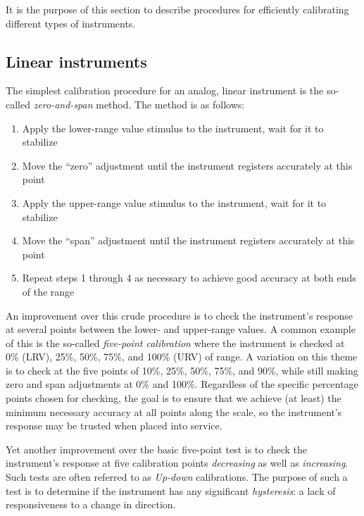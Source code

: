 
It is the purpose of this section to describe procedures for efficiently calibrating different types of instruments.

\filbreak
\subsection{Linear instruments}

The simplest calibration procedure for an analog, linear instrument is the so-called \textit{zero-and-span} method.  The method is as follows:

\begin{enumerate}
\item Apply the lower-range value stimulus to the instrument, wait for it to stabilize
\item Move the ``zero'' adjustment until the instrument registers accurately at this point
\item Apply the upper-range value stimulus to the instrument, wait for it to stabilize
\item Move the ``span'' adjustment until the instrument registers accurately at this point
\item Repeat steps 1 through 4 as necessary to achieve good accuracy at both ends of the range
\end{enumerate}

An improvement over this crude procedure is to check the instrument's response at several points between the lower- and upper-range values.  A common example of this is the so-called \textit{five-point calibration} where the instrument is checked at 0\% (LRV), 25\%, 50\%, 75\%, and 100\% (URV) of range.  A variation on this theme is to check at the five points of 10\%, 25\%, 50\%, 75\%, and 90\%, while still making zero and span adjustments at 0\% and 100\%.  Regardless of the specific percentage points chosen for checking, the goal is to ensure that we achieve (at least) the minimum necessary accuracy at all points along the scale, so the instrument's response may be trusted when placed into service.  

Yet another improvement over the basic five-point test is to check the instrument's response at five calibration points \textit{decreasing} as well as \textit{increasing}.  Such tests are often referred to as \textit{Up-down} calibrations.  The purpose of such a test is to determine if the instrument has any significant \textit{hysteresis}: a lack of responsiveness to a change in direction.   


